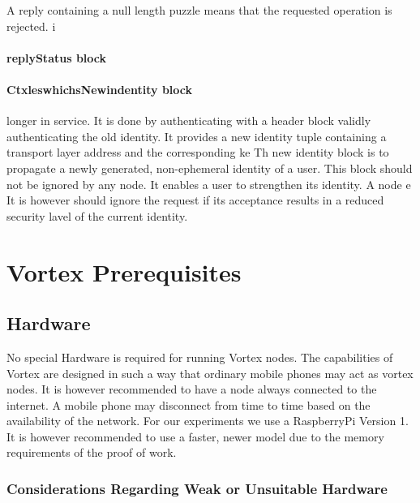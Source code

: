 A reply containing a null length puzzle means that the requested operation is rejected.
                                 i

\subsubsection{replyStatus block}

\subsubsection{CtxleswhichsNewindentity block}                                                                                                                                            longer in service. It  is done by authenticating with a header block validly authenticating the old identity. It provides a new identity tuple containing a transport layer address and the corresponding ke
Th new identity block is to propagate a newly generated, non-ephemeral identity of a user. This block should not be ignored by any node. It enables a user to strengthen its identity. 
             A node                                                                             e
It is however should ignore the request if its acceptance results in a reduced security lavel of the current identity.


\chapter{Vortex Prerequisites}
\section{Hardware}
No special Hardware is required for running Vortex nodes. The capabilities of Vortex are designed in such a way that ordinary mobile phones may act as vortex nodes. It is however recommended to have a node always connected to the internet. A mobile phone may disconnect from time to time based on the availability of the network. For our experiments we use a RaspberryPi Version 1. It is however recommended to use a faster, newer model due to the memory requirements of the proof of work.


\subsection{Considerations Regarding Weak or Unsuitable Hardware}

